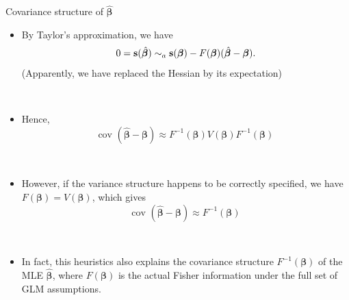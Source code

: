\documentclass{beamer}
\newcommand{\boldbeta}{{\boldsymbol \beta}}
\begin{document}
\begin{frame}{Covariance structure of $\hat{\boldsymbol \beta}$ }

\begin{itemize}
\item By Taylor's approximation, we have
\[
0 = {\bf s} (\hat{\boldsymbol \beta}) \sim_a   {\bf s} ({\boldsymbol \beta})  - F({\boldsymbol \beta})(\hat{\boldsymbol \beta} - {\boldsymbol \beta}).
\]
(Apparently, we have replaced the Hessian by its expectation)

\ \

\item Hence,
\[
\text{cov } (\hat{\boldsymbol \beta} - {\boldsymbol \beta}) \approx F^{-1}({\boldsymbol \beta}) V(\boldbeta) F^{-1}({\boldsymbol \beta})
\]

\ \
\item However, if the variance structure happens to be  correctly specified, we have $F(\boldbeta)  = V(\boldbeta)$, which gives
\[
\text{cov } (\hat{\boldsymbol \beta} - {\boldsymbol \beta}) \approx F^{-1}({\boldsymbol \beta})
\]

\ \
\item In fact, this heuristics also explains the  covariance structure  $F^{-1}(\boldbeta)$ of the MLE $\hat{\boldbeta}$, where $F(\boldbeta)$ is the actual Fisher information under the full set of GLM assumptions.



\end{itemize}


\end{frame}
\end{document}
